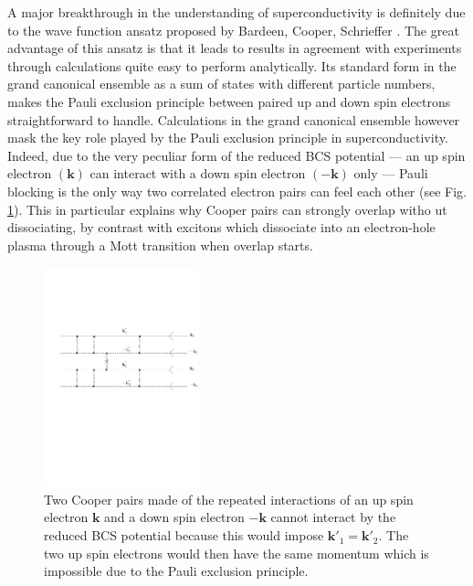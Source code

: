 \documentclass[twocolumn,showpacs]{revtex4}
\def\v#1{\mathbf{#1}}
\begin{document}
A major breakthrough in the understanding of superconductivity is definitely due to the wave function ansatz proposed by Bardeen, Cooper, Schrieffer \cite{BCS}. The great advantage of this ansatz is that it leads to results in agreement with experiments through calculations quite easy to perform analytically. Its standard form in the grand canonical ensemble as a sum of  states with different particle numbers, makes the Pauli exclusion principle between paired up and down spin electrons straightforward to handle. Calculations in the grand canonical ensemble however mask the key role played by the Pauli exclusion principle in superconductivity. Indeed, due to the very peculiar form of the reduced BCS potential --- an up spin electron $(\v k)$ can interact with a down spin electron $(-\v k)$ only --- Pauli blocking is the only way two correlated electron pairs can feel each other (see Fig. \ref{fig:shiva}). This in particular explains why Cooper pairs can strongly overlap witho
 ut dissociating, by contrast with excitons which dissociate into an electron-hole plasma through a Mott transition when overlap starts.
\begin{figure}[htbp]
\begin{center}
\includegraphics[width=0.4\textwidth]{shiva}
\caption{Two Cooper pairs made of the repeated interactions of an up spin electron $\v k$ and a down spin electron $-\v{k}$ cannot interact by the reduced BCS potential because this would impose $\v{k}'_1=\v{k}'_2$.  The two up spin electrons would then have the same momentum which is impossible due to the Pauli exclusion principle. \label{fig:shiva}} 

\end{center}
\end{figure}
\end{document}
